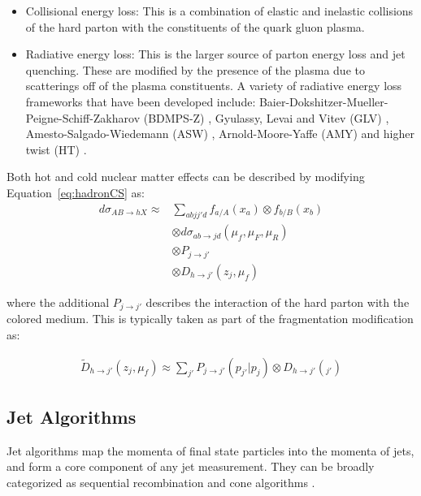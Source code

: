 \begin{itemize}
\item Collisional energy loss: This is a combination of elastic and inelastic collisions of the hard parton with the constituents of the quark gluon plasma.

\item Radiative energy loss: This is the larger source of parton energy loss and jet quenching.
These are modified by the presence of the plasma due to scatterings off of the plasma constituents.
A variety of radiative energy loss frameworks that have been developed include: Baier-Dokshitzer-Mueller-Peigne-Schiff-Zakharov (BDMPS-Z) \cite{BAIER1997291}, Gyulassy, Levai and Vitev (GLV) \cite{Gyulassy:1999zd}, Amesto-Salgado-Wiedemann (ASW) \cite{Wiedemann:2000za},  Arnold-Moore-Yaffe (AMY) \cite{Arnold:2001ba} and higher twist (HT) \cite{Guo:2000nz}.
\end{itemize}

Both hot and cold nuclear matter effects can be described by modifying Equation~\ref{eq:hadronCS} as:
\begin{align}
d \sigma_{AB \rightarrow hX}  \approx & \sum_{abjj'd} f_{a/A} (x_a) \otimes f_{b/B} (x_b) \\ 
& \otimes d\sigma_{ab\rightarrow jd} (\mu_f, \mu_F, \mu_R)  \nonumber \\
& \otimes P_{j\rightarrow j'} \nonumber \\
& \otimes D_{h \rightarrow j'} (z_j, \mu_f) \nonumber 
\end{align}

where the additional $P_{j\rightarrow j'}$ describes the interaction of the hard parton with the colored medium.
This is typically taken as part of the fragmentation modification as:

\begin{align}
\widetilde{D}_{h \rightarrow j'} (z_j, \mu_f) \approx \sum_{j'} P_{j\rightarrow j'} (p_{j'} | p_j) \otimes D_{h\rightarrow j'} (_{j'})
\end{align}


\subsection{Jet Algorithms}
\label{sec:jet_algo}
Jet algorithms map the momenta of final state particles into the momenta of jets, and form a core component of any jet measurement.
They can be broadly categorized as sequential recombination and cone algorithms \cite{Atkin_2015}. 

